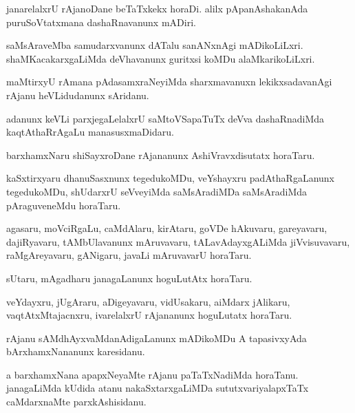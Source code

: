 \documentclass{article}
\begin{document}
\begin{mn}%
janarelalxrU rAjanoDane beTaTxkekx horaDi. alilx pApanAshakanAda puruSoVtatxmana 
dashaRnavanunx mADiri.
\end{mn}

\begin{mn}%
saMsAraveMba samudarxvanunx dATalu sanANxnAgi mADikoLiLxri. shaMKacakarxgaLiMda 
deVhavanunx guritxsi koMDu alaMkarikoLiLxri.
\end{mn}

\begin{mn}%
maMtirxyU rAmana pAdasamxraNeyiMda sharxmavanuxn lekikxsadavanAgi rAjanu heVLidudanunx 
sAridanu.
\end{mn}

\begin{mn}%
adanunx keVLi parxjegaLelalxrU saMtoVSapaTuTx deVva dashaRnadiMda kaqtAthaRrAgaLu 
manasusxmaDidaru.
\end{mn}

\begin{mn}%
barxhamxNaru shiSayxroDane rAjananunx AshiVravxdisutatx horaTaru.
\end{mn}

\begin{mn}%
kaSxtirxyaru dhanuSasxnunx tegedukoMDu, veYshayxru padAthaRgaLanunx tegedukoMDu, shUdarxrU 
seVveyiMda saMsAradiMDa saMsAradiMda pAraguveneMdu horaTaru.
\end{mn}

\begin{mn}%
agasaru, moVciRgaLu, caMdAlaru, kirAtaru, goVDe hAkuvaru, gareyavaru, dajiRyavaru, 
tAMbUlavanunx mAruvavaru, tALavAdayxgALiMda jiVvisuvavaru, raMgAreyavaru, gANigaru, javaLi 
mAruvavarU horaTaru.
\end{mn}

\begin{mn}%
sUtaru, mAgadharu janagaLanunx hoguLutAtx horaTaru.
\end{mn}

\begin{mn}%
veYdayxru, jUgAraru, aDigeyavaru, vidUsakaru, aiMdarx jAlikaru, vaqtAtxMtajacnxru, 
ivarelalxrU rAjananunx hoguLutatx horaTaru.
\end{mn}

\begin{mn}%
rAjanu sAMdhAyxvaMdanAdigaLanunx mADikoMDu A tapasivxyAda bArxhamxNananunx karesidanu.
\end{mn}

\begin{mn}%
a barxhamxNana apapxNeyaMte rAjanu paTaTxNadiMda horaTanu. janagaLiMda kUdida atanu 
nakaSxtarxgaLiMDa sututxvariyalapxTaTx caMdarxnaMte parxkAshisidanu.
\end{mn}
\end{document}

